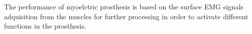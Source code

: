 


The performance of myoelctric prosthesis is based on the surface EMG signals adquisition from the muscles for further processing in order to activate different functions in the prosthesis\cite{jiang2012}.


